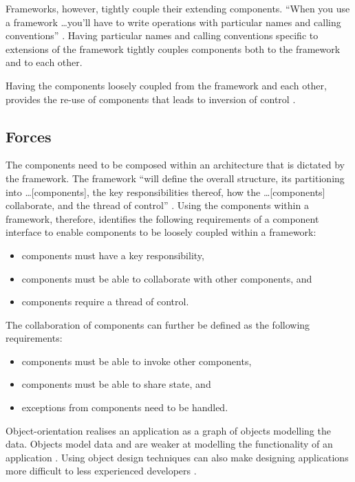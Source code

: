 \documentclass[prodmode]{style/acmlarge}
\begin{document}
Frameworks, however, tightly couple their extending components.  ``When you use a
framework \ldots you'll have to write operations with particular names and
calling conventions'' \cite[p. 27]{gof}.  Having particular names and calling
conventions specific to extensions of the framework  tightly couples components
both to the framework and to each other.

Having the components loosely coupled from the framework and each other,
provides the re-use of components that leads to inversion of control \cite{gof}.


\subsection{Forces}

The components need to be composed within an architecture that is dictated by
the framework.  The framework ``will define the overall structure, its
partitioning into \ldots [components], the key responsibilities thereof, how the
\ldots [components] collaborate, and the thread of control'' \cite[p.26]{gof}.
Using the components within a framework, therefore, identifies the following
requirements of a component interface to enable components to be loosely coupled
within a framework:
\begin{itemize}
  \item components must have a key responsibility,
  \item components must be able to collaborate with other components, and
  \item components require a thread of control.
\end{itemize}

The collaboration of components can further be defined as the following
requirements:
\begin{itemize}
  \item components must be able to invoke other components,
  \item components must be able to share state, and
  \item exceptions from components need to be handled.
\end{itemize}

Object-orientation realises an application as a graph of objects modelling the
data.  Objects model data and are weaker at modelling the functionality of an
application \cite{oo-behaviour}.  Using object design techniques can also make
designing applications more difficult to less experienced developers
\cite{oo-design}.
\end{document}
